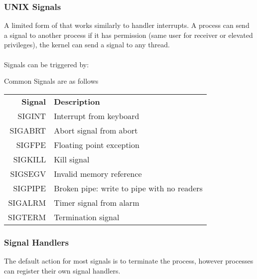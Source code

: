 \documentclass{report}
\begin{document}
        \subsubsection*{UNIX Signals}
            A limited form of  that works similarly to handler interrupts. A process can send a signal to another process if it has permission (same user for receiver or elevated privileges), the kernel can send a signal to any thread.
            \\
            \\ Signals can be triggered by:
            \begin{itemize}
            \end{itemize}
            Common Signals are as follows
            \begin{center}
                \begin{tabular}{r l}
                    \textbf{Signal} & \textbf{Description} \\
                    SIGINT & Interrupt from keyboard \\
                    SIGABRT & Abort signal from abort \\
                    SIGFPE & Floating point exception \\
                    SIGKILL & Kill signal \\
                    SIGSEGV & Invalid memory reference \\
                    SIGPIPE & Broken pipe: write to pipe with no readers \\
                    SIGALRM & Timer signal from alarm \\
                    SIGTERM & Termination signal \\
                \end{tabular}
            \end{center}
        \subsubsection*{Signal Handlers}
            The default action for most signals is to terminate the process, however processes can register their own signal handlers.
            
        
\end{document}
